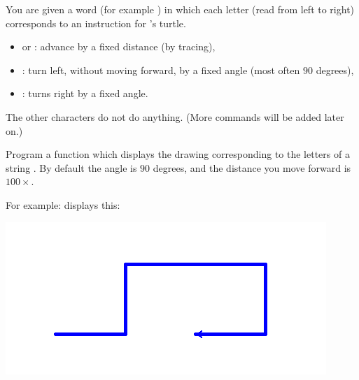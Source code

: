 \documentclass[11pt,class=report,crop=false]{standalone}
\begin{document}

\begin{activite}


You are given a word (for example ) in which each letter (read from left to right) corresponds to an instruction for \Python's turtle.

\begin{itemize}
  \item {} or : advance by a fixed distance (by tracing),
  \item {}: turn left, without moving forward, by a fixed angle (most often $90$ degrees),
  \item {}: turns right by a fixed angle.
\end{itemize}

The other characters do not do anything. (More commands will be added later on.)

Program a  function
which displays the drawing corresponding to the letters of a string . By default the angle is $90$ degrees, and the distance you move forward is $100 \times$.

For example:  displays this:
\begin{center}
\includegraphics[scale=\myscale,scale=0.6]{screen-lsystems-1}
\end{center}

\end{activite}


\end{document}
